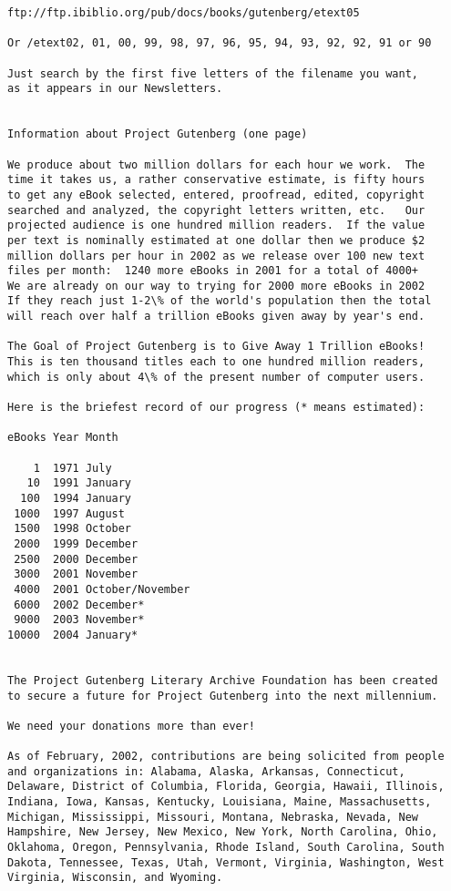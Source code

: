 \documentclass[oneside]{book}
\begin{document}
{\begin{verbatim}
ftp://ftp.ibiblio.org/pub/docs/books/gutenberg/etext05

Or /etext02, 01, 00, 99, 98, 97, 96, 95, 94, 93, 92, 92, 91 or 90

Just search by the first five letters of the filename you want,
as it appears in our Newsletters.


Information about Project Gutenberg (one page)

We produce about two million dollars for each hour we work.  The
time it takes us, a rather conservative estimate, is fifty hours
to get any eBook selected, entered, proofread, edited, copyright
searched and analyzed, the copyright letters written, etc.   Our
projected audience is one hundred million readers.  If the value
per text is nominally estimated at one dollar then we produce $2
million dollars per hour in 2002 as we release over 100 new text
files per month:  1240 more eBooks in 2001 for a total of 4000+
We are already on our way to trying for 2000 more eBooks in 2002
If they reach just 1-2\% of the world's population then the total
will reach over half a trillion eBooks given away by year's end.

The Goal of Project Gutenberg is to Give Away 1 Trillion eBooks!
This is ten thousand titles each to one hundred million readers,
which is only about 4\% of the present number of computer users.

Here is the briefest record of our progress (* means estimated):

eBooks Year Month

    1  1971 July
   10  1991 January
  100  1994 January
 1000  1997 August
 1500  1998 October
 2000  1999 December
 2500  2000 December
 3000  2001 November
 4000  2001 October/November
 6000  2002 December*
 9000  2003 November*
10000  2004 January*


The Project Gutenberg Literary Archive Foundation has been created
to secure a future for Project Gutenberg into the next millennium.

We need your donations more than ever!

As of February, 2002, contributions are being solicited from people
and organizations in: Alabama, Alaska, Arkansas, Connecticut,
Delaware, District of Columbia, Florida, Georgia, Hawaii, Illinois,
Indiana, Iowa, Kansas, Kentucky, Louisiana, Maine, Massachusetts,
Michigan, Mississippi, Missouri, Montana, Nebraska, Nevada, New
Hampshire, New Jersey, New Mexico, New York, North Carolina, Ohio,
Oklahoma, Oregon, Pennsylvania, Rhode Island, South Carolina, South
Dakota, Tennessee, Texas, Utah, Vermont, Virginia, Washington, West
Virginia, Wisconsin, and Wyoming.


\end{verbatim}}
\end{document}
